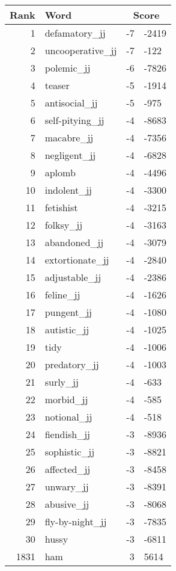 \begin{longtable}[!htbp]{| rlr@{.}l |}
    \hline
    \textbf{Rank} & \textbf{Word} & \multicolumn{2}{c|}{\textbf{Score}} \\
    \hline
    \endhead
    1 & defamatory\_jj & -7 & -2419 \\
    2 & uncooperative\_jj & -7 & -122 \\
    3 & polemic\_jj & -6 & -7826 \\
    4 & teaser & -5 & -1914 \\
    5 & antisocial\_jj & -5 & -975 \\
    6 & self-pitying\_jj & -4 & -8683 \\
    7 & macabre\_jj & -4 & -7356 \\
    8 & negligent\_jj & -4 & -6828 \\
    9 & aplomb & -4 & -4496 \\
    10 & indolent\_jj & -4 & -3300 \\
    11 & fetishist & -4 & -3215 \\
    12 & folksy\_jj & -4 & -3163 \\
    13 & abandoned\_jj & -4 & -3079 \\
    14 & extortionate\_jj & -4 & -2840 \\
    15 & adjustable\_jj & -4 & -2386 \\
    16 & feline\_jj & -4 & -1626 \\
    17 & pungent\_jj & -4 & -1080 \\
    18 & autistic\_jj & -4 & -1025 \\
    19 & tidy & -4 & -1006 \\
    20 & predatory\_jj & -4 & -1003 \\
    21 & surly\_jj & -4 & -633 \\
    22 & morbid\_jj & -4 & -585 \\
    23 & notional\_jj & -4 & -518 \\
    24 & fiendish\_jj & -3 & -8936 \\
    25 & sophistic\_jj & -3 & -8821 \\
    26 & affected\_jj & -3 & -8458 \\
    27 & unwary\_jj & -3 & -8391 \\
    28 & abusive\_jj & -3 & -8068 \\
    29 & fly-by-night\_jj & -3 & -7835 \\
    30 & hussy & -3 & -6811 \\
    1831 & ham & 3 & 5614 \\

\end{longtable}
